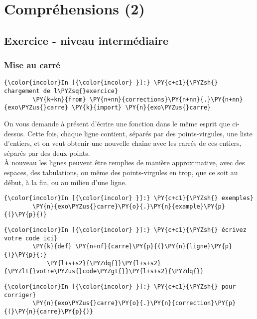     \hypertarget{compruxe9hensions-2}{%
\section{Compréhensions (2)}\label{compruxe9hensions-2}}

    \hypertarget{exercice---niveau-intermuxe9diaire}{%
\subsection{Exercice - niveau
intermédiaire}\label{exercice---niveau-intermuxe9diaire}}

    \hypertarget{mise-au-carruxe9}{%
\subsubsection{Mise au carré}\label{mise-au-carruxe9}}

    \begin{Verbatim}[commandchars=\\\{\}]
{\color{incolor}In [{\color{incolor} }]:} \PY{c+c1}{\PYZsh{} chargement de l\PYZsq{}exercice}
        \PY{k+kn}{from} \PY{n+nn}{corrections}\PY{n+nn}{.}\PY{n+nn}{exo\PYZus{}carre} \PY{k}{import} \PY{n}{exo\PYZus{}carre}
\end{Verbatim}


    On vous demande à présent d'écrire une fonction dans le même esprit que
ci-dessus. Cette fois, chaque ligne contient, séparés par des
points-virgules, une liste d'entiers, et on veut obtenir une nouvelle
chaîne avec les carrés de ces entiers, séparés par des deux-points.\\

À nouveau les lignes peuvent être remplies de manière approximative,
avec des espaces, des tabulations, ou même des points-virgules en trop,
que ce soit au début, à la fin, ou au milieu d'une ligne.

    \begin{Verbatim}[commandchars=\\\{\}]
{\color{incolor}In [{\color{incolor} }]:} \PY{c+c1}{\PYZsh{} exemples}
        \PY{n}{exo\PYZus{}carre}\PY{o}{.}\PY{n}{example}\PY{p}{(}\PY{p}{)}
\end{Verbatim}


    \begin{Verbatim}[commandchars=\\\{\}]
{\color{incolor}In [{\color{incolor} }]:} \PY{c+c1}{\PYZsh{} écrivez votre code ici}
        \PY{k}{def} \PY{n+nf}{carre}\PY{p}{(}\PY{n}{ligne}\PY{p}{)}\PY{p}{:}
            \PY{l+s+s2}{\PYZdq{}}\PY{l+s+s2}{\PYZlt{}votre\PYZus{}code\PYZgt{}}\PY{l+s+s2}{\PYZdq{}}
\end{Verbatim}


    \begin{Verbatim}[commandchars=\\\{\}]
{\color{incolor}In [{\color{incolor} }]:} \PY{c+c1}{\PYZsh{} pour corriger}
        \PY{n}{exo\PYZus{}carre}\PY{o}{.}\PY{n}{correction}\PY{p}{(}\PY{n}{carre}\PY{p}{)}
\end{Verbatim}